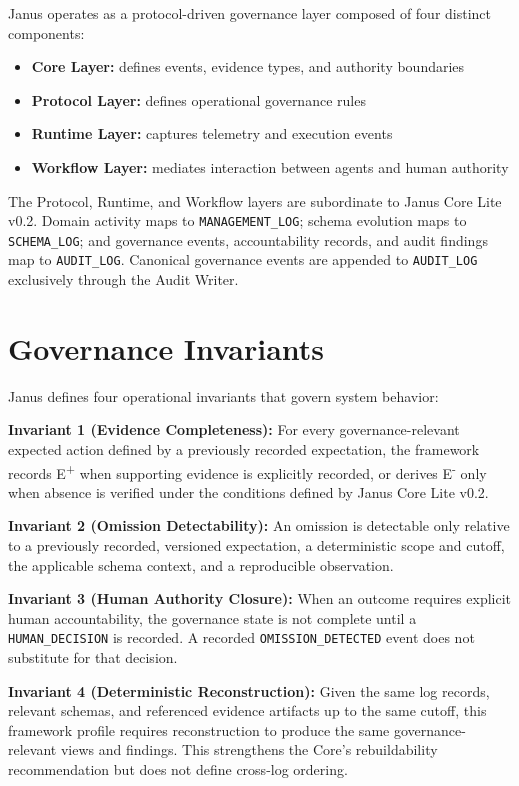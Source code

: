 \documentclass[conference]{IEEEtran}
\begin{document}
Janus operates as a protocol-driven governance layer composed of four distinct
components:

\begin{itemize}
    \item \textbf{Core Layer:} defines events, evidence types, and authority boundaries
    \item \textbf{Protocol Layer:} defines operational governance rules
    \item \textbf{Runtime Layer:} captures telemetry and execution events
    \item \textbf{Workflow Layer:} mediates interaction between agents and human authority
\end{itemize}

The Protocol, Runtime, and Workflow layers are subordinate to Janus Core Lite
v0.2. Domain activity maps to \texttt{MANAGEMENT\_LOG}; schema evolution maps to
\texttt{SCHEMA\_LOG}; and governance events, accountability records, and audit
findings map to \texttt{AUDIT\_LOG}. Canonical governance events are appended to
\texttt{AUDIT\_LOG} exclusively through the Audit Writer.

\section{Governance Invariants}

Janus defines four operational invariants that govern system behavior:

\medskip
\noindent\textbf{Invariant 1 (Evidence Completeness):}
For every governance-relevant expected action defined by a previously recorded
expectation, the framework records E\textsuperscript{+} when supporting evidence
is explicitly recorded, or derives E\textsuperscript{-} only when absence is
verified under the conditions defined by Janus Core Lite v0.2.

\medskip
\noindent\textbf{Invariant 2 (Omission Detectability):}
An omission is detectable only relative to a previously recorded, versioned
expectation, a deterministic scope and cutoff, the applicable schema context,
and a reproducible observation.

\medskip
\noindent\textbf{Invariant 3 (Human Authority Closure):}
When an outcome requires explicit human accountability, the governance state is
not complete until a \texttt{HUMAN\_DECISION} is recorded. A recorded
\texttt{OMISSION\_DETECTED} event does not substitute for that decision.

\medskip
\noindent\textbf{Invariant 4 (Deterministic Reconstruction):}
Given the same log records, relevant schemas, and referenced evidence artifacts
up to the same cutoff, this framework profile requires reconstruction to produce
the same governance-relevant views and findings. This strengthens the Core's
rebuildability recommendation but does not define cross-log ordering.
\end{document}
